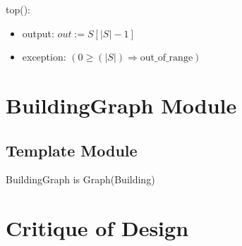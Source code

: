 \documentclass[12pt]{article}
\begin{document}
\noindent top():
\begin{itemize}
\item output: $\mathit{out} := S[|S| - 1]$

\item exception: $( 0 \geq (|S|) \Rightarrow \text{out\_of\_range})$    \\

\end{itemize}

\newpage

\section* {BuildingGraph Module}

\subsection* {Template Module}

BuildingGraph is Graph(Building) \\

\newpage

\section*{Critique of Design}
\end{document}
